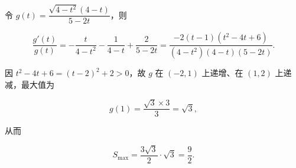 \begin{answer}
令 $g(t)=\dfrac{\sqrt{4-t^2}(4-t)}{5-2t}$，则

\nopagebreak[4]
\[\frac{g'(t)}{g(t)}=-\frac t{4-t^2}-\frac1{4-t}+\frac2{5-2t}=\frac{-2(t-1)(t^2-4t+6)}{(4-t^2)(4-t)(5-2t)}.\]

因 $t^2-4t+6=(t-2)^2+2>0$，故 $g$ 在 $(-2,1)$ 上递增、在 $(1,2)$ 上递减，最大值为

\nopagebreak[4]
\[g(1)=\frac{\sqrt3\times3}{3}=\sqrt3,\]

从而

\nopagebreak[4]
\[S_{\max}=\frac{3\sqrt3}2\cdot\sqrt3=\frac92.\]


\end{answer}